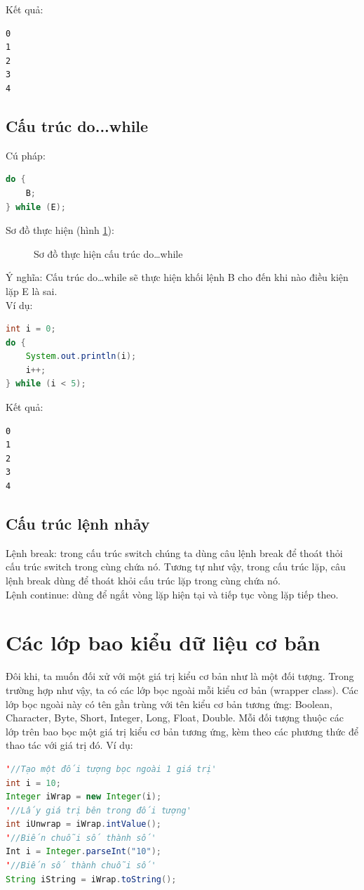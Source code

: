 \indent Kết quả:
\begin{verbatim}
0
1
2
3
4
\end{verbatim}
\subsection{Cấu trúc do...while}
\indent Cú pháp:
\begin{lstlisting}[escapechar=',language=java]	
do {
	B;
} while (E);
\end{lstlisting}

\indent Sơ đồ thực hiện (hình \ref{hinh16}):
\begin{figure}[!ht]
\centering

\caption{Sơ đồ thực hiện cấu trúc do…while}\label{hinh16} 
\end{figure}

\indent Ý nghĩa: Cấu trúc {\ttfamily do…while} sẽ thực hiện khối lệnh {\ttfamily B} cho đến khi nào điều kiện lặp {\ttfamily E} là sai.\\
\indent Ví dụ:\\

\begin{lstlisting}[escapechar=!,language=java]	
int i = 0;
do {
	System.out.println(i);
	i++;
} while (i < 5);
\end{lstlisting}

\indent Kết quả:
\begin{verbatim}
0
1
2
3
4
\end{verbatim}
\subsection{Cấu trúc lệnh nhảy}
\indent Lệnh break: trong cấu trúc switch chúng ta dùng câu lệnh break để thoát thỏi cấu trúc switch trong cùng chứa nó. Tương tự như vậy, trong cấu trúc lặp, câu lệnh break dùng để thoát khỏi cấu trúc lặp trong cùng chứa nó. \\
\indent Lệnh continue: dùng để ngắt vòng lặp hiện tại và tiếp tục vòng lặp tiếp theo.
\section{Các lớp bao kiểu dữ liệu cơ bản}
\indent Đôi khi, ta muốn đối xử với một giá trị kiểu cơ bản như là một đối tượng. Trong trường hợp như vậy, ta có các lớp bọc ngoài mỗi kiểu cơ bản (wrapper class). Các lớp bọc ngoài này có tên gần trùng với tên kiểu cơ bản tương ứng: {\ttfamily Boolean, Character, Byte, Short, Integer, Long, Float, Double}. Mỗi đối tượng thuộc các lớp trên bao bọc một giá trị kiểu cơ bản tương ứng, kèm theo các phương thức để thao tác với giá trị đó. Ví dụ:
\begin{lstlisting}[escapechar=',language=java]	
'//Tạo một đối tượng bọc ngoài 1 giá trị'
int i = 10;
Integer iWrap = new Integer(i);
'//Lấy giá trị bên trong đối tượng'
int iUnwrap = iWrap.intValue();
'//Biến chuỗi số thành số'
Int i = Integer.parseInt("10");
'//Biến số thành chuỗi số'
String iString = iWrap.toString();
\end{lstlisting}

